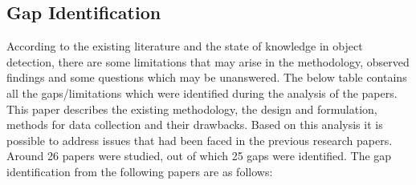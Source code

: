 \documentclass[12pt,a4paper]{report}
\begin{document}
\subsection {Gap Identification} %
\par According to the existing literature and the state of knowledge in object detection, there are some limitations that may arise in the methodology, observed findings and some questions which may be unanswered. The below table contains all the gaps/limitations which were identified during the analysis of the papers. This paper describes the existing methodology, the design and formulation, methods for data collection and their drawbacks. Based on this analysis it is possible to address issues that had been faced in the previous research papers. 
       Around 26 papers were studied, out of which 25 gaps were 
identified.
     The gap identification from the following papers
are as follows:
\end{document}
